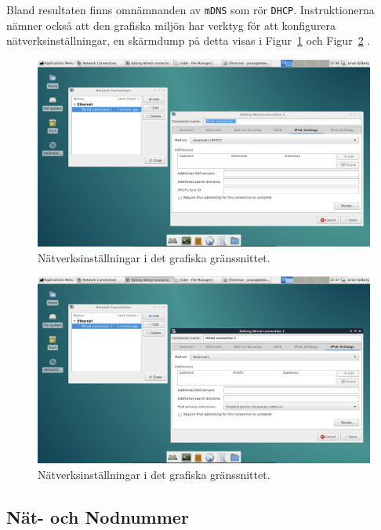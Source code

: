 Bland resultaten finns omnämnanden av \texttt{mDNS} som rör \texttt{DHCP}.
Instruktionerna nämner också att den grafiska miljön har verktyg för att
konfigurera nätverksinställningar, en skärmdump på detta visas i
Figur~\ref{fig:scr_1-network_A} och Figur~\ref{fig:scr_1-network_B} .

\begin{figure}[htp]
  \centering
  \includegraphics[scale=0.35]{include/scr_1-network_A.png}
  \caption{Nätverksinställningar i det grafiska gränssnittet.}
  \label{fig:scr_1-network_A}
\end{figure}

\begin{figure}[htp]
  \centering
  \includegraphics[scale=0.35]{include/scr_1-network_B.png}
  \caption{Nätverksinställningar i det grafiska gränssnittet.}
  \label{fig:scr_1-network_B}
\end{figure}



\subsection{Nät- och Nodnummer}
